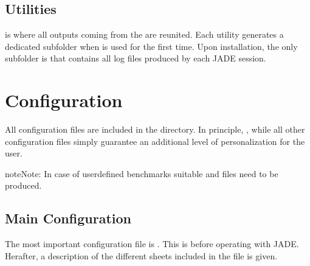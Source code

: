 \documentclass[letterpaper,10pt,english]{sphinxmanual}
\begin{document}
\section{Utilities}
\label{\detokenize{usage/folders:utilities}}
 is where all outputs coming from the {\hyperref[\detokenize{usage/utilities:uty}]{}} are reunited. Each utility generates
a dedicated sub\sphinxhyphen{}folder when is used for the first time. Upon installation, the only sub\sphinxhyphen{}folder is
 that contains all log files produced by each JADE session.


\chapter{Configuration}
\label{\detokenize{usage/configuration:configuration}}\label{\detokenize{usage/configuration:config}}\label{\detokenize{usage/configuration::doc}}
All configuration files are included in the  directory.
In principle,  {\hyperref[\detokenize{usage/configuration:mainconfig}]{}} , while
all other configuration files simply guarantee an additional level of personalization for the user.

\begin{sphinxadmonition}{note}{Note:}
In case of user\sphinxhyphen{}defined benchmarks suitable {\hyperref[\detokenize{usage/configuration:runconf}]{}} and {\hyperref[\detokenize{usage/configuration:ppconf}]{}} files need
to be produced.
\end{sphinxadmonition}


\section{Main Configuration}
\label{\detokenize{usage/configuration:main-configuration}}\label{\detokenize{usage/configuration:mainconfig}}
The most important configuration file is .
This is  before operating with JADE.
Herafter, a description of the different sheets included in the file is given.
\end{document}

